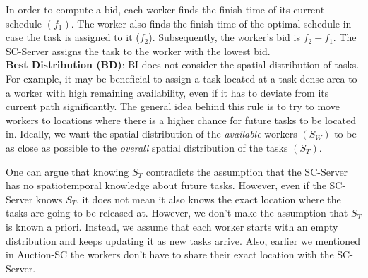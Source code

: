 In order to compute a bid, each worker finds the finish time of its current schedule $(f_1)$. The worker also finds the finish time of the optimal schedule in case the task is assigned to it ($f_2$). Subsequently, the worker's bid is $f_2 - f_1$. The SC-Server assigns the task to the worker with the lowest bid.\\



\noindent \textbf{Best Distribution (BD)}: 
BI does not consider the spatial distribution of tasks. For example, it may be beneficial to assign a task located at a task-dense area to a worker with high remaining availability, even if it has to deviate from its current path significantly. The general idea behind this rule is to try to move workers to locations where there is a higher chance for future tasks to be located in. Ideally, we want the spatial distribution of the \textit{available} workers $(S_W)$ to be as close as possible to the \textit{overall} spatial distribution of the tasks $(S_T)$.

One can argue that knowing $S_T$ contradicts the assumption that the SC-Server has no spatiotemporal knowledge about future tasks. However, even if the SC-Server knows $S_T$, it does not mean it also knows the exact location where the tasks are going to be released at. However, we don't make the assumption that $S_T$ is known a priori. Instead, we assume that each worker starts with an empty distribution and keeps updating it as new tasks arrive. Also, earlier we mentioned in Auction-SC the workers don't have to share their exact location with the SC-Server. 

